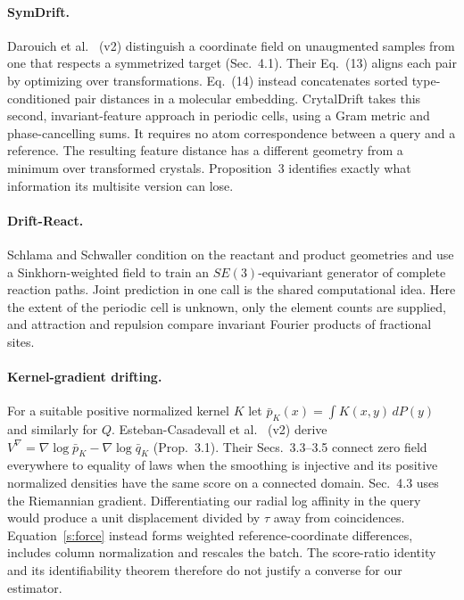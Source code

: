 \paragraph{SymDrift.}
Darouich et al.\ \cite{symdrift} (v2) distinguish a coordinate field on unaugmented samples from one that respects a symmetrized target (Sec.~4.1). Their Eq.~(13) aligns each pair by optimizing over transformations. Eq.~(14) instead concatenates sorted type-conditioned pair distances in a molecular embedding. CrytalDrift takes this second, invariant-feature approach in periodic cells, using a Gram metric and phase-cancelling sums. It requires no atom correspondence between a query and a reference. The resulting feature distance has a different geometry from a minimum over transformed crystals. Proposition~3 identifies exactly what information its multisite version can lose.

\paragraph{Drift-React.}
Schlama and Schwaller \cite{driftreact} condition on the reactant and product geometries and use a Sinkhorn-weighted field to train an $SE(3)$-equivariant generator of complete reaction paths. Joint prediction in one call is the shared computational idea. Here the extent of the periodic cell is unknown, only the element counts are supplied, and attraction and repulsion compare invariant Fourier products of fractional sites.

\paragraph{Kernel-gradient drifting.}
For a suitable positive normalized kernel $K$ let $\bar p_K(x)=\int K(x,y)\,dP(y)$ and similarly for $Q$. Esteban-Casadevall et al.\ \cite{kgdrift} (v2) derive $V^\nabla=\nabla\log\bar p_K-\nabla\log\bar q_K$ (Prop.~3.1). Their Secs.~3.3--3.5 connect zero field everywhere to equality of laws when the smoothing is injective and its positive normalized densities have the same score on a connected domain. Sec.~4.3 uses the Riemannian gradient. Differentiating our radial log affinity in the query would produce a unit displacement divided by $\tau$ away from coincidences. Equation~\eqref{s:force} instead forms weighted reference-coordinate differences, includes column normalization and rescales the batch. The score-ratio identity and its identifiability theorem therefore do not justify a converse for our estimator.

